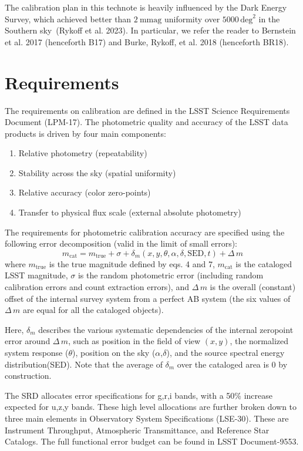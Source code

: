 \documentclass[SE,authoryear,lsstdraft,toc]{lsstdoc}
\newcommand{\mcat}{m_{\mathrm{cat}}}
\newcommand{\mtrue}{m_{\mathrm{true}}}
\newcommand{\deltam}{\delta_m}
\newcommand{\Deltam}{\Delta\,m}
\begin{document}
The calibration plan in this technote is heavily influenced by the Dark Energy
Survey, which achieved better than $2~\mathrm{mmag}$ uniformity over
$5000\,\mathrm{deg}^2$ in the Southern sky~(Rykoff et al. 2023).  In
particular, we refer the reader to Bernstein et al. 2017 (henceforth B17) and
Burke, Rykoff, et al. 2018 (henceforth BR18).

\section{Requirements}

The requirements on calibration are defined in the LSST Science Requirements
Document (LPM-17). The photometric quality and accuracy of the LSST data
products is driven by four main components:
\begin{enumerate}
    \item Relative photometry (repeatability)
    \item Stability across the sky (spatial uniformity)
    \item Relative accuracy (color zero-points)
    \item Transfer to physical flux scale (external absolute photometry)
\end{enumerate}

The requirements for photometric calibration accuracy are specified using the
following error decomposition (valid in the limit of small errors):
%
\begin{equation}
    \mcat = \mtrue +\sigma+\deltam (x,y,\theta,\alpha,\delta,\mathrm{SED},t)+\Deltam
\end{equation}
%
where $\mtrue$ is the true magnitude defined by eqs. 4 and 7, $\mcat$ is the
cataloged LSST magnitude, $\sigma$ is the random photometric error (including
random calibration errors and count extraction errors), and $\Deltam$ is the
overall (constant) offset of the internal survey system from a perfect AB
system (the six values of $\Deltam$ are equal for all the cataloged objects).

Here, $\deltam$ describes the various systematic dependencies of the internal
zeropoint error around $\Deltam$, such as position in the field of view $(x,
y)$, the normalized system response ($\theta$), position on the sky
($\alpha$,$\delta$), and the source spectral energy distribution(SED).  Note
that the average of $\deltam$ over the cataloged area is 0 by construction.

The SRD allocates error specifications for g,r,i bands, with a 50\% increase
expected for u,z,y bands. These high level allocations are further broken
down to three main elements in Observatory System Specifications
(LSE-30). These are Instrument Throughput, Atmospheric Transmittance, and
Reference Star Catalogs. The full functional error budget can be found in LSST
Document-9553.
\end{document}
